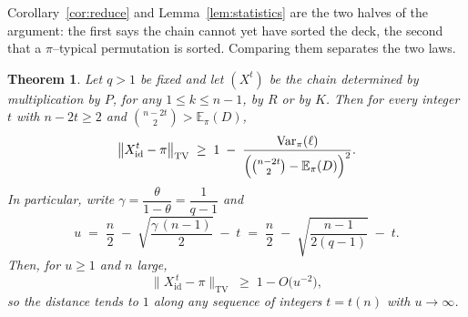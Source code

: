 \documentclass[11pt]{article}
\theoremstyle{plain}  %
\newtheorem{theorem}{Theorem}[section]
\begin{document}
Corollary~\ref{cor:reduce} and Lemma~\ref{lem:statistics} are the two halves of the
argument: the first says the chain cannot yet have sorted the deck, the second that a
$\pi$--typical permutation is sorted. Comparing them separates the two laws.

\begin{theorem}\label{thm:l1}
Let $q>1$ be fixed and let $(X^{t})$ be the chain determined by multiplication by $P$, for
any $1\le k\le n-1$, by $R$ or by $K$. Then for every integer $t$ with $n-2t\ge2$ and
$\binom{n-2t}{2} > \mathbb{E}_\pi(D)$,
\begin{equation}\label{eq:master-tv}
  \bigl\|X^{t}_{\mathrm{id}} - \pi\bigr\|_{\mathrm{TV}}
  \;\ge\; 1 \;-\; \frac{\mathrm{Var}_\pi(\ell)}
                       {\Bigl(\binom{n-2t}{2} - \mathbb{E}_\pi(D)\Bigr)^{2}} .
\end{equation}
In particular, write $\gamma = \dfrac{\theta}{1-\theta} = \dfrac{1}{q-1}$ and
\begin{equation}\label{eq:tvthreshold}
  u \;=\; \frac n2 \;-\; \sqrt{\frac{\gamma\,(n-1)}{2}} \;-\; t
    \;=\; \frac n2 \;-\; \sqrt{\frac{n-1}{2(q-1)}} \;-\; t .
\end{equation}
Then, for $u \ge 1$ and $n$ large,
$$
  \bigl\|X^{\,t}_{\mathrm{id}} - \pi\bigr\|_{\mathrm{TV}} \;\ge\; 1 - O\bigl(u^{-2}\bigr) ,
$$
so the distance tends to $1$ along any sequence of integers $t = t(n)$ with
$u \to \infty$.
\end{theorem}
\end{document}
